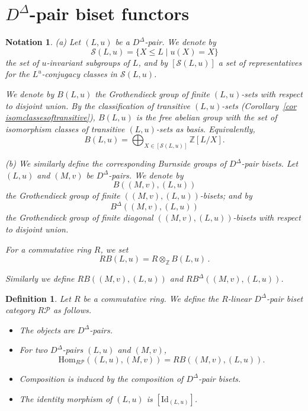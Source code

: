 \documentclass[11pt]{article}
\theoremstyle{change}  %
\newtheorem{definition}[theorem]{Definition}
\newtheorem{notation}[theorem]{Notation}
\newcommand{\calP}{\mathcal{P}}
\newcommand{\Hom}{\mathrm{Hom}}
\newcommand{\ZZ}{\mathbb{Z}}
\newcommand{\Id}{\mathrm{Id}}
\newcommand{\DD}{D^{\Delta}}
\begin{document}

\section{$\DD$-pair biset functors}\label{sec DDelta-pair biset functors}


\begin{notation}
{\rm (a)} Let $(L,u)$ be a $\DD$-pair. We denote by
\[
\mathcal S(L,u)=\{X\leq L\mid u(X)=X\}
\]
the set of $u$-invariant subgroups of $L$, and by $[\mathcal S(L,u)]$ a set of representatives for the $L^u$-conjugacy classes in $\mathcal S(L,u)$.

We denote by $B(L,u)$ the Grothendieck group of finite $(L,u)$-sets with respect to disjoint union. By the classification of transitive $(L,u)$-sets (Corollary~\ref{cor isomclassesoftransitive}),
$B(L,u)$ is the free abelian group with the set of isomorphism classes of transitive $(L,u)$-sets as basis. Equivalently,
\[
B(L,u)=\bigoplus_{X\in[\mathcal S(L,u)]}\ZZ[L/X].
\]

\smallskip
{\rm (b)} We similarly define the corresponding Burnside groups of $\DD$-pair bisets. Let $(L,u)$ and $(M,v)$ be $\DD$-pairs. We denote by
\[
B((M,v),(L,u))
\]
the Grothendieck group of finite $((M,v),(L,u))$-bisets; and by
\[
B^\Delta((M,v),(L,u))
\] 
the Grothendieck group of finite diagonal $((M,v),(L,u))$-bisets with respect to disjoint union. 

For a commutative ring $R$, we set
\[
R B(L,u)=R\otimes_{\ZZ} B(L,u)\,.
\]

Similarly we define $R B((M,v),(L,u))$ and $R B^\Delta((M,v),(L,u))$. 
\end{notation}

\begin{definition}
	Let $R$ be a commutative ring. We define the $R$-linear $\DD$-pair biset category $R \calP$ as follows.
	\begin{itemize}
		\item The objects are $\DD$-pairs.
		\item For two $\DD$-pairs $(L,u)$ and $(M,v)$,
		\[
		\Hom_{R \calP}((L,u),(M,v))=R B((M,v),(L,u)).
		\]
		\item Composition is induced by the composition of $\DD$-pair bisets. 
		\item The identity morphism of $(L,u)$ is $[\Id_{(L,u)}]$.
	\end{itemize}
\end{definition} 
\end{document}
